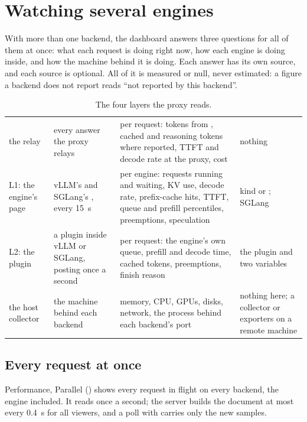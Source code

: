 \chapter{Watching several engines}\label{ch:hosts}

With more than one backend, the dashboard answers three questions for all of them at once: what each request is doing right now, how each engine is doing inside, and how the machine behind it is doing. Each answer has its own source, and each source is optional. All of it is measured or null, never estimated: a figure a backend does not report reads \enquote{not reported by this backend}.

\begin{table}[htbp]
\centering\small
\caption{The four layers the proxy reads.}\label{tab:layers}
\begin{tabularx}{\linewidth}{@{}L{.16\linewidth}L{.24\linewidth}YL{.2\linewidth}@{}}
\toprule
{} &  &  &  \\
\midrule
the relay & every answer the proxy relays & per request: tokens from , cached and reasoning tokens where reported, TTFT and decode rate at the proxy, cost & nothing \\
L1: the engine's page & vLLM's and SGLang's , every 15~s & per engine: requests running and waiting, KV use, decode rate, prefix-cache hits, TTFT, queue and prefill percentiles, preemptions, speculation & kind  or ; SGLang  \\
L2: the plugin & a plugin inside vLLM or SGLang, posting once a second & per request: the engine's own queue, prefill and decode time, cached tokens, preemptions, finish reason & the plugin and two variables \\
the host collector & the machine behind each backend & memory, CPU, GPUs, disks, network, the process behind each backend's port & nothing here; a collector or exporters on a remote machine \\
\bottomrule
\end{tabularx}
\end{table}

\section{Every request at once}\label{sec:parallel}

Performance, Parallel () shows every request in flight on every backend, the engine included. It reads  once a second; the server builds the document at most every 0.4~s for all viewers, and a poll with  carries only the new samples.

